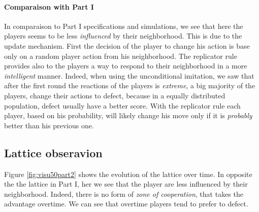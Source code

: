 \documentclass[letterpaper]{article}
\begin{document}
\paragraph{Comparaison with Part I}

In comparaison to Part I specifications and simulations, we see that here
the players seems to be less \textit{influenced} by their neighborhood.
This is due to the update mechanism. First the decision of the player to
change his action is base only on a random player action from his neighborhood.
The replicator rule provides also to the players
a way to respond to their neighborhood in a more \textit{intelligent} manner.
Indeed, when using the unconditional imitation, we saw that after the first
round the reactions of the players is
\textit{extreme}, a big majority of the players,
change their actions to defect, because in a equally distributed population,
defect usually have a better score. With the replicator rule each player,
based on his probability, will likely change his move only if it is
\textit{probably} better than his previous one.


\subsection{Lattice obseravion}

Figure \ref{fig:visu50part2} shows the evolution of the lattice over time.
In opposite the the lattice in Part I, her we see that the player are less
influenced by their neighborhood. Indeed, there is no form of
\textit{zone of cooperation}, that takes the advantage overtime.
We can see that overtime players tend to prefer to defect.
\end{document}
